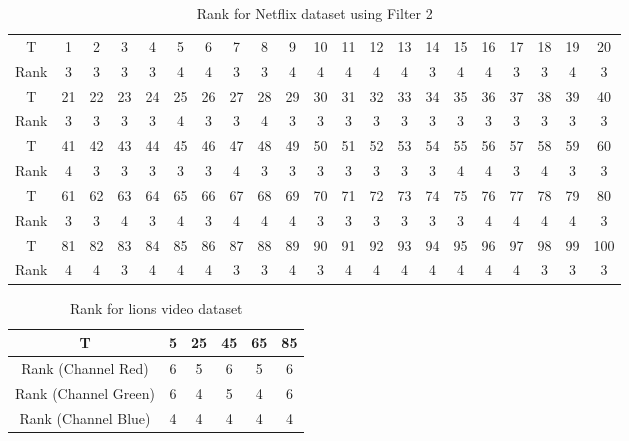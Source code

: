 \documentclass[12pt]{article}
\begin{document}
\begin{table}[!ht]
    \centering
    \caption{Rank for Netflix dataset using Filter 2}
    \label{table:netflix_filter2}
    \begin{tabular}{c|c|c|c|c|c|c|c|c|c|c|c|c|c|c|c|c|c|c|c|c}
    \hline
     T & 1&2 &3 &4 &5 & 6 & 7& 8 & 9 & 10&  11  & 12&   13&   14&   15&   16&   17 &  18 &  19  & 20\\
     Rank & 3&  3&  3 & 3&  4 & 4 & 3&  3&  4&  4&  4&  4 & 4 & 3 & 4&  4&  3&  3&  4 & 3 \\
     \hline
    T & 21 &  22  & 23&   24 &  25 &  26 &  27 &  28  & 29 &  30  & 31 &  32 &  33  & 34 &  35&   36&   37 & 38  & 39 &  40 \\
     Rank   & 3 & 3&  3&  3 & 4 & 3 & 3&  4&  3&  3 & 3 & 3&  3 & 3&  3 & 3&  3&  3 & 3 & 3 \\
     \hline
    T &41  & 42&   43 &  44 &  45  & 46  & 47  & 48 &  49 &  50 &  51  & 52& 
 53 &  54  & 55  & 56 &  57 &  58 &  59 &  60  \\
 Rank & 4 & 3&  3 & 3 & 3 & 3 & 4 & 3 & 3 & 3 & 3&  3&  3 & 3 & 4&  4 & 3&  4 & 3 & 3 \\
  \hline
T & 61 &  62  & 63 &  64 &  65 &  66 &  67 &  68  & 69&   70  & 71  & 72 &  73 &  74 &  75 &  76  & 77 &  78 &  79  & 80 \\
  Rank & 3&  3&  4&  3 & 4 & 3 & 4&  4&  4 & 3 & 3&  3&  3 & 3 & 3 & 4&  4&  4  & 4&  3\\
 \hline
T &  81 &  82&   83 &  84  & 85 &  86 &  87  & 88 &  89 &  90 &  91 &  92 &  93&   94 &  95 &  96&   97 &  98 &  99 & 100\\
  Rank &  4 & 4 & 3 & 4&  4&  4&  3&  3 & 4&  3&  4&  4&  4&  4 & 4 & 4 & 4&  3 & 3 & 3\\
   \hline
    \end{tabular}
\end{table}

\begin{table}[!ht]
    \centering
    \caption{Rank for lions video dataset}
    \label{table:lions}
    \begin{tabular}{c|c|c|c|c|c}
    \hline
         T &  5 & 25 & 45 & 65 & 85 \\
         \hline
         Rank (Channel Red)& 6&5&6&5&6\\
         Rank (Channel Green) & 6&4&5&4&6\\
         Rank (Channel Blue) & 4 & 4 & 4 & 4& 4\\
         \hline
    \end{tabular}
\end{table}
\end{document}
